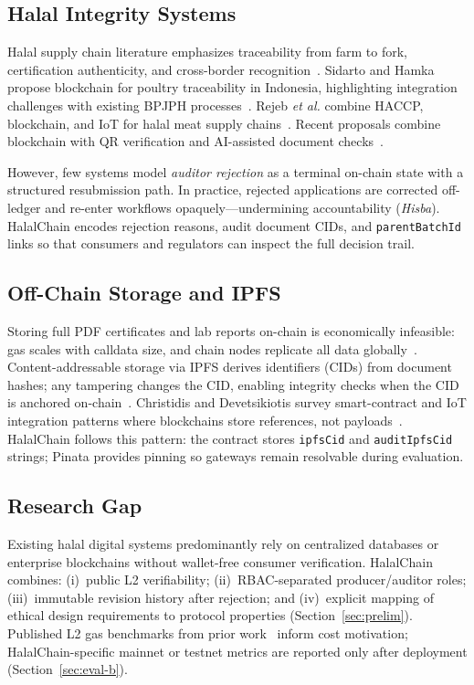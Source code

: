 \subsection{Halal Integrity Systems}
Halal supply chain literature emphasizes traceability from farm to fork, certification authenticity, and cross-border recognition~\cite{sidarto2021halal,rejeb2018halal,rashid2018halal}.
Sidarto and Hamka propose blockchain for poultry traceability in Indonesia, highlighting integration challenges with existing BPJPH processes~\cite{sidarto2021halal}.
Rejeb \emph{et al.} combine HACCP, blockchain, and IoT for halal meat supply chains~\cite{rejeb2018halal}.
Recent proposals combine blockchain with QR verification and AI-assisted document checks~\cite{alourani2025halal,marianingsih2024halal}.

However, few systems model \emph{auditor rejection} as a terminal on-chain state with a structured resubmission path.
In practice, rejected applications are corrected off-ledger and re-enter workflows opaquely---undermining accountability (\emph{Hisba}).
HalalChain encodes rejection reasons, audit document CIDs, and \texttt{parentBatchId} links so that consumers and regulators can inspect the full decision trail.

\subsection{Off-Chain Storage and IPFS}
Storing full PDF certificates and lab reports on-chain is economically infeasible: gas scales with calldata size, and chain nodes replicate all data globally~\cite{benet2014ipfs,christidis2016blockchain}.
Content-addressable storage via IPFS derives identifiers (CIDs) from document hashes; any tampering changes the CID, enabling integrity checks when the CID is anchored on-chain~\cite{benet2014ipfs}.
Christidis and Devetsikiotis survey smart-contract and IoT integration patterns where blockchains store references, not payloads~\cite{christidis2016blockchain}.
HalalChain follows this pattern: the contract stores \texttt{ipfsCid} and \texttt{auditIpfsCid} strings; Pinata provides pinning so gateways remain resolvable during evaluation.

\subsection{Research Gap}
Existing halal digital systems predominantly rely on centralized databases or enterprise blockchains without wallet-free consumer verification.
HalalChain combines: (i)~public L2 verifiability; (ii)~RBAC-separated producer/auditor roles; (iii)~immutable revision history after rejection; and (iv)~explicit mapping of ethical design requirements to protocol properties (Section~\ref{sec:prelim}).
Published L2 gas benchmarks from prior work~\cite{kalodner2018arbitrum} inform cost motivation; HalalChain-specific mainnet or testnet metrics are reported only after deployment (Section~\ref{sec:eval-b}).
